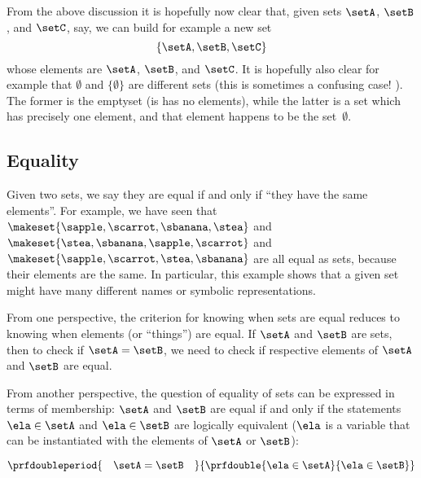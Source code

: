 From the above discussion it is hopefully now clear that, given sets $\setA$, $\setB$, and $\setC$, say, we can build for example a new set
\begin{equation}
    \{ \setA, \setB, \setC \}
\end{equation}
whose elements are $\setA$, $\setB$, and $\setC$.
It is hopefully also clear for example that $\emptyset$ and $\{ \emptyset \}$ are different sets (this is sometimes a confusing case!
).
The former is the emptyset (is has no elements), while the latter is a set which has precisely one element, and that element happens to be the set~$\emptyset$.

\subsection{Equality}

Given two sets, we say they are equal if and only if ``they have the same elements''.
For example, we have seen that $\makeset{ \sapple, \scarrot, \sbanana, \stea }$ and~$\makeset{ \stea, \sbanana, \sapple, \scarrot}$ and~$\makeset{ \sapple, \scarrot, \stea, \sbanana }$ are all equal as sets, because their elements are the same.
In particular, this example shows that a given set might have many different names or symbolic representations.

From one perspective, the criterion for knowing when sets are equal reduces to knowing when elements (or ``things'') are equal.
If $\setA$ and $\setB$ are sets, then to check if $\setA = \setB$, we need to check if respective elements of $\setA$ and $\setB$ are equal.

From another perspective, the question of equality of sets can be expressed in terms of membership: $\setA$ and $\setB$ are equal if and only if the statements $\ela \in \setA$ and $\ela \in \setB$ are logically equivalent ($\ela$ is a variable that can be instantiated with the elements of $\setA$ or $\setB$):

\begin{equation*}
    \prfdoubleperiod{
        \quad \setA = \setB \quad
    }{
        \prfdouble{
            \ela \in \setA
        }{
            \ela \in \setB
        }
    }
\end{equation*}


